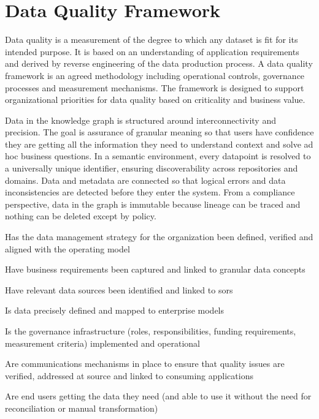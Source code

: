 \section{Data Quality Framework}\label{sec:ekgmm-b-3-1} %

Data quality is a measurement of the degree to which any dataset is fit for its intended purpose.
It is based on an understanding of application requirements and derived by reverse engineering of the
data production process.
A data quality framework is an agreed methodology including operational controls, governance processes and
measurement mechanisms.
The framework is designed to support organizational priorities for data quality based on criticality and business value.

\ekgmmContextSection

Data in the knowledge graph is structured around interconnectivity and precision.
The goal is assurance of granular meaning so that users have confidence they are getting all the information they
need to understand context and solve ad hoc business questions.
In a semantic environment, every datapoint is resolved to a universally unique identifier, ensuring discoverability
across repositories and domains.
Data and metadata are connected so that logical errors and data inconsistencies are detected before they enter
the system.
From a compliance perspective, data in the graph is immutable because lineage can be traced and
nothing can be deleted except by policy.

\kgmmcorequestionssection

\begin{core-questions}

  \item [\thesection.1] Has the data management strategy for the organization been defined, verified and aligned
                        with the operating model
  \item [\thesection.2] Have business requirements been captured and linked to granular data concepts
  \item [\thesection.3] Have relevant data sources been identified and linked to \glspl{sor}
  \item [\thesection.4] Is data precisely defined and mapped to enterprise models
  \item [\thesection.5] Is the governance infrastructure (roles, responsibilities, funding requirements,
                        measurement criteria) imple\-mented and operational
  \item [\thesection.6] Are communications mechanisms in place to ensure that quality issues are verified,
                        addressed at source and linked to consuming applications
  \item [\thesection.7] Are end users getting the data they need (and able to use it without the need for
                        reconciliation or manual transformation)

\end{core-questions}

